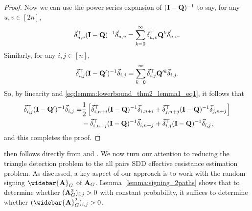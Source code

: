 \begin{proof}
Now we can use the power series expansion of $(\mathbf{I} - \mathbf{Q})^{-1}$ to say, for any $u, v \in [2n]$,
\begin{align*}
    \vec{\delta}_{u,v}^\top (\mathbf{I} - \mathbf{Q})^{-1} \vec{\delta}_{u,v} = \sum_{k=0}^\infty \vec{\delta}_{u,v}^\top \mathbf{Q}^k \vec{\delta}_{u,v}. 
\end{align*}
Similarly, for any $i, j \in [n]$, 
\begin{align*}
    \vec{\delta}_{i,j}^\top (\mathbf{I} - \mathbf{Q}')^{-1} \vec{\delta}_{i,j} = \sum_{k=0}^\infty \vec{\delta}_{i,j}^\top \mathbf{Q}'^k \vec{\delta}_{i,j}. 
\end{align*}
So, by linearity and \eqref{eq:lemma:lowerbound_thm2_lemma1_eq1}, it follows that 
\begin{align*}
    \vec{\delta}_{i,j}^\top (\mathbf{I} - \mathbf{Q}')^{-1} \vec{\delta}_{i,j} =&  \frac{1}{2} \left[\vec{\delta}_{i,n+i}^\top (\mathbf{I} - \mathbf{Q})^{-1} \vec{\delta}_{i,n+i} + \vec{\delta}_{j,n+j}^\top (\mathbf{I} - \mathbf{Q})^{-1} \vec{\delta}_{j,n+j}\right]\\ 
    &-\vec{\delta}_{i,n+j}^\top (\mathbf{I} - \mathbf{Q})^{-1} \vec{\delta}_{i,n+j} + \vec{\delta}_{i,j}^\top (\mathbf{I} - \mathbf{Q})^{-1} \vec{\delta}_{i,j},
\end{align*}
and this completes the proof.

\end{proof}
 then follows directly from  and . We now turn our attention to reducing the triangle detection problem to the all pairs SDD effective resistance estimation problem. As discussed, a key aspect of our approach is to work with the random signing $\widebar{\A}_G$ of $\mathbf{A}_G$. Lemma~\ref{lemma:signing_2paths} shows that to determine whether $(\mathbf{A}_G^2)_{i,j} > 0$ with constant probability, it suffices to determine whether $(\widebar{\A}_G^2)_{i,j} > 0$. 


